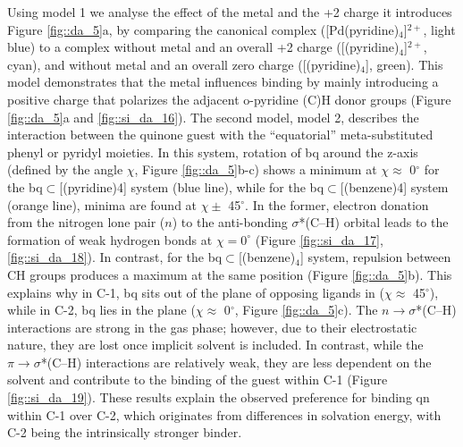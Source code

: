 \documentclass[../../main.tex]{subfiles}
\begin{document}
Using model 1 we analyse the effect of the metal and the +2 charge it introduces Figure \ref{fig::da_5}a, by comparing the canonical complex ([Pd(pyridine)$_4$]$^{2+}$,  light blue) to a complex without metal and an overall +2 charge ([(pyridine)$_4$]$^{2+}$, cyan), and without metal and an overall zero charge ([(pyridine)$_4$], green). This model demonstrates that the metal influences binding by mainly introducing a positive charge that polarizes the adjacent o-pyridine (C)H donor groups (Figure \ref{fig::da_5}a and \ref{fig::si_da_16}). The second model, model 2, describes the interaction between the quinone guest with the “equatorial” meta-substituted phenyl or pyridyl moieties. In this system, rotation of bq around the z-axis (defined by the angle $\chi$, Figure \ref{fig::da_5}b-c) shows a minimum at $\chi \approx$ 0${}^\circ$ for the bq$\subset$[(pyridine)4] system (blue line), while for the bq$\subset$[(benzene)4] system (orange line), minima are found at $\chi \pm$ 45${}^\circ$. In the former, electron donation from the nitrogen lone pair ($n$) to the anti-bonding $\sigma$*(C–H) orbital leads to the formation of weak hydrogen bonds at $\chi = 0^\circ$ (Figure \ref{fig::si_da_17}, \ref{fig::si_da_18}).\cite{Lewis2013} In contrast, for the bq$\subset$[(benzene)$_4$] system, repulsion between CH groups produces a maximum at the same position (Figure \ref{fig::da_5}b). This explains why in C-1, bq sits out of the plane of opposing ligands in ($\chi \approx$ 45${}^\circ$), while in C-2, bq lies in the plane ($\chi \approx$ 0${}^\circ$, Figure \ref{fig::da_5}c). The $n \rightarrow \sigma$*(C–H) interactions are strong in the gas phase; however, due to their electrostatic nature, they are lost once implicit solvent is included. In contrast, while the $\pi \rightarrow \sigma$*(C–H) interactions are relatively weak, they are less dependent on the solvent and contribute to the binding of the guest within C-1 (Figure \ref{fig::si_da_19}). These results explain the observed preference for binding qn within C-1 over C-2, which originates from differences in solvation energy, with C-2 being the intrinsically stronger binder. 
\end{document}
